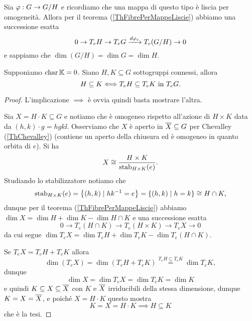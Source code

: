 \begin{remark}\label{ReDimensioneDelQuoziente}
Sia $\varphi:G\to G/H$ e ricordiamo che una mappa di questo tipo \`e liscia per omogeneit\`a. Allora per il teorema (\ref{ThFibrePerMappeLiscie}) abbiamo una successione esatta
\[0\to T_{e}H\to T_{e}G\xrightarrow{d\varphi_{e}}T_{e}(G/H)\to 0\]
e sappiamo che $\dim (G/H)=\dim G=\dim H$.
\end{remark}

\begin{proposition}\label{PrContenimentoTraSottogruppiSiControllaSuiTangenti}
Supponiamo $\operatorname{char}\mathbb{K}=0$. Siano $H,K\subseteq G$ sottogruppi connessi, allora
\[H\subseteq K\Longleftrightarrow T_e H\subseteq T_eK\text{ in }T_eG.\]
\end{proposition}
\begin{proof}
L'implicazione $\implies$ \`e ovvia quindi basta mostrare l'altra.

Sia $X=H\cdot K\subseteq G$ e notiamo che \`e omogeneo rispetto all'azione di $H\times K$ data da $(h,k)\cdot g=hgk\ii$.
Osserviamo che $X$ \`e aperto in $\overline{X}\subseteq G$ per Chevalley (\ref{ThChevalley}) (contiene un aperto della chiusura ed \`e omogeneo in quanto orbita di $e$).
Si ha
\[X\cong \frac{H\times K}{\operatorname{stab}_{H\times K}(e)}.\]
Studiando lo stabilizzatore notiamo che
\[\operatorname{stab}_{H\times K}(e)=\left\{{(h,k)\mid hk^{-1}=e}\right\}=\left\{{(h,k)\mid h=k}\right\}\cong H\cap K,\]
dunque per il teorema (\ref{ThFibrePerMappeLiscie}) abbiamo $\dim X=\dim H+\dim K-\dim H\cap K$ e una successione esatta
\[0\to T_e(H\cap K)\to T_e(H\times K)\to T_e X\to 0\]
da cui segue $\dim T_e X=\dim T_eH+\dim T_eK-\dim T_e(H\cap K)$.
\medskip

Se $T_e X=T_eH+T_eK$ allora 
\[\dim (T_e X)=\dim (T_eH+T_eK)\overset{T_e H\subseteq T_eK}=\dim T_eK,\]
dunque 
\[\dim X=\dim T_eX=\dim T_eK=\dim K\]
e quindi $K\subseteq X\subseteq \overline{X}$ con $K$ e $\overline{X}$ irriducibili della stessa dimensione, dunque $K=X=\overline{X}$, e poich\'e $X=H\cdot K$ questo mostra 
\[K=X=H\cdot K\implies H\subseteq K\]
che \`e la tesi.


\end{proof}

